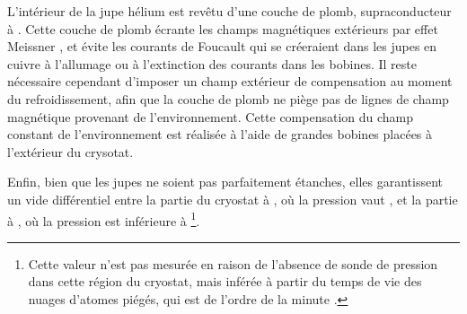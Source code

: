 L'intérieur de la jupe hélium est revêtu d'une couche de plomb, supraconducteur à \Khe. Cette couche de plomb écrante les champs magnétiques extérieurs par effet Meissner \cite{MX_MEISSNEREFFECT}, et évite les courants de Foucault qui se créeraient dans les jupes en cuivre à l'allumage ou à l'extinction des courants dans les bobines. 
Il reste nécessaire cependant d'imposer un champ extérieur de compensation au moment du refroidissement, afin que la couche de plomb ne piège pas de lignes de champ magnétique provenant de l'environnement.
Cette compensation du champ constant de l'environnement est réalisée à l'aide de grandes bobines placées à l'extérieur du crysotat.

Enfin, bien que les jupes ne soient pas parfaitement étanches, elles garantissent un vide différentiel entre la partie du cryostat à , où la pression vaut , et la partie à \Khe, où la pression est inférieure à \footnote{
Cette valeur n'est pas mesurée en raison de l'absence de sonde de pression dans cette région du cryostat, mais inférée à partir du temps de vie des nuages d'atomes piégés, qui est de l'ordre de la minute \cite{ENS_CHIPLIFETIME}.}.

